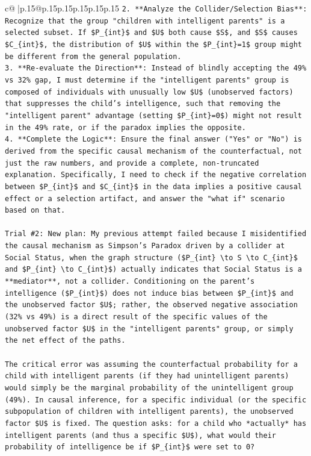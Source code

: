 \documentclass{article}
\begin{document}
{\begin{supertabular}{c@{$\;$}|p{.15\linewidth}@{}p{.15\linewidth}p{.15\linewidth}p{.15\linewidth}p{.15\linewidth}p{.15\linewidth}}
{{{\texttt{2.  **Analyze the Collider/Selection Bias**: Recognize that the group "children with intelligent parents" is a selected subset. If \$P\_\{int\}\$ and \$U\$ both cause \$S\$, and \$S\$ causes \$C\_\{int\}\$, the distribution of \$U\$ within the \$P\_\{int\}=1\$ group might be different from the general population.} \\
\texttt{3.  **Re{-}evaluate the Direction**: Instead of blindly accepting the 49\% vs 32\% gap, I must determine if the "intelligent parents" group is composed of individuals with unusually low \$U\$ (unobserved factors) that suppresses the child's intelligence, such that removing the "intelligent parent" advantage (setting \$P\_\{int\}=0\$) might not result in the 49\% rate, or if the paradox implies the opposite.} \\
\texttt{4.  **Complete the Logic**: Ensure the final answer ("Yes" or "No") is derived from the specific causal mechanism of the counterfactual, not just the raw numbers, and provide a complete, non{-}truncated explanation. Specifically, I need to check if the negative correlation between \$P\_\{int\}\$ and \$C\_\{int\}\$ in the data implies a positive causal effect or a selection artifact, and answer the "what if" scenario based on that.} \\
\\ 
\texttt{Trial \#2: New plan: My previous attempt failed because I misidentified the causal mechanism as Simpson's Paradox driven by a collider at Social Status, when the graph structure (\$P\_\{int\} \textbackslash{}to S \textbackslash{}to C\_\{int\}\$ and \$P\_\{int\} \textbackslash{}to C\_\{int\}\$) actually indicates that Social Status is a **mediator**, not a collider. Conditioning on the parent's intelligence (\$P\_\{int\}\$) does not induce bias between \$P\_\{int\}\$ and the unobserved factor \$U\$; rather, the observed negative association (32\% vs 49\%) is a direct result of the specific values of the unobserved factor \$U\$ in the "intelligent parents" group, or simply the net effect of the paths.} \\
\\ 
\texttt{The critical error was assuming the counterfactual probability for a child with intelligent parents (if they had unintelligent parents) would simply be the marginal probability of the unintelligent group (49\%). In causal inference, for a specific individual (or the specific subpopulation of children with intelligent parents), the unobserved factor \$U\$ is fixed. The question asks: for a child who *actually* has intelligent parents (and thus a specific \$U\$), what would their probability of intelligence be if \$P\_\{int\}\$ were set to 0?} \\
}}}
\end{supertabular}}
\end{document}
